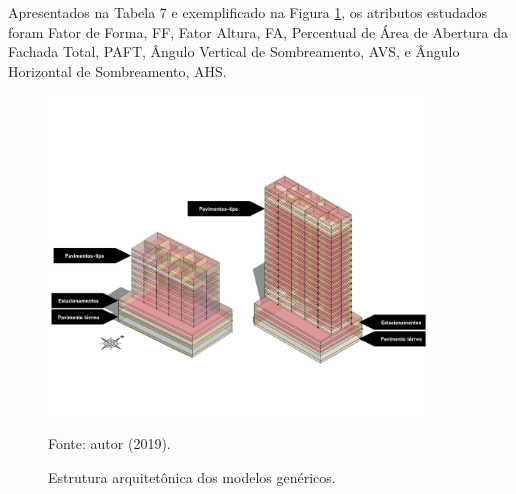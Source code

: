 Apresentados na Tabela 7 e exemplificado na Figura \ref{fig:figura11}, os atributos estudados foram Fator de 
Forma, FF, Fator Altura, FA, Percentual de Área de Abertura da Fachada Total, PAFT, Ângulo 
Vertical de Sombreamento, AVS, e Ângulo Horizontal de Sombreamento, AHS.
    \begin{figure}[ht]
        \centering
        \caption{\small Estrutura arquitetônica dos modelos genéricos.}
        \includegraphics[width=0.9\textwidth]{figures/fig11_8-19-2pav.png}
        \begin{flushleft}
            \par \small Fonte: autor (2019).
        \end{flushleft}
        \label{fig:figura11}
    \end{figure}
